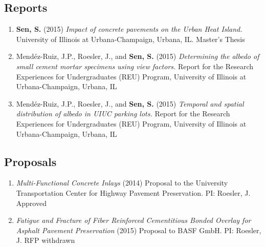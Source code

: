 \documentclass[12pt]{article}
\begin{document}
\subsection*{Reports}
\begin{enumerate}[label=(R\arabic*)]
	\item \textbf{Sen, S.} (2015) \textit{Impact of concrete pavements on the Urban Heat Island.} University of Illinois at Urbana-Champaign, Urbana, IL. Master’s Thesis
	\item Mend\'ez-Ruiz, J.P., Roesler, J., and \textbf{Sen, S.} (2015) \textit{Determining the albedo of small cement mortar specimens using view factors.} Report for the Research Experiences for Undergraduates (REU) Program, University of Illinois at Urbana-Champaign, Urbana, IL
	\item Mend\'ez-Ruiz, J.P., Roesler, J., and \textbf{Sen, S.} (2015) \textit{Temporal and spatial distribution of albedo in UIUC parking lots.} Report for the Research Experiences for Undergraduates (REU) Program, University of Illinois at Urbana-Champaign, Urbana, IL
\end{enumerate}

\subsection*{Proposals}
\begin{enumerate}[label=(P\arabic*)]
	\item \textit{Multi-Functional Concrete Inlays} (2014) Proposal to the University Transportation Center for Highway Pavement Preservation. PI: Roesler, J. Approved
	\item \textit{Fatigue and Fracture of Fiber Reinforced Cementitious Bonded Overlay for Asphalt Pavement Preservation} (2015) Proposal to BASF GmbH. PI: Roesler, J. RFP withdrawn
\end{enumerate}

\end{document}
